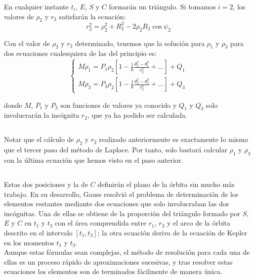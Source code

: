 \documentclass[11pt]{article}
\begin{document}
En cualquier instante $t_i$, $E$, $S$ y $C$ formarán un triángulo. Si tomamos $i=2$, los valores de $\rho_2$ y $r_2$ satisfarán la ecuación:
\[
r_2^2=\rho_2^2+R_2^2-2\rho_2R_2\cos{\psi_2}
\]

Con el valor de $\rho_2$ y $r_2$ determinado, tenemos que la solución para $\rho_1$ y $\rho_3$ para dos ecuaciones cualesquiera de las del principio es:
\[
\left\{
\begin{array}{l}
	M\rho_1=P_1\rho_2[1-\frac{1}{6}\frac{\theta_2^2-\theta_1^2}{r_2^3}+...]+Q_1\\
	M\rho_3=P_3\rho_2[1-\frac{1}{6}\frac{\theta_2^2-\theta_3^2}{r_2^3}+...]+Q_3
\end{array}
\right.
\]

\noindent donde $M$, $P_1$ y $P_3$ son funciones de valores ya conocido y $Q_1$ y $Q_3$ solo involucrarán la incógnita $r_2$, que ya ha podido ser calculada.\\

\subsection{}
Notar que el cálculo de $\rho_2$ y $r_2$ realizado anteriormente es exactamente lo mismo que el tercer paso del método de Laplace. Por tanto, solo bastará calcular $\rho_1$ y $\rho_3$ con la última ecuación que hemos visto en el paso anterior.\\

\subsection{}
Estas dos posiciones y la de $C$ definirán el plano de la órbita sin mucho más trabajo. En su desarrollo, Gauss resolvió el problema de determinación de los elementos restantes mediante dos ecuaciones que solo involucraban las dos incógnitas. Una de ellas se obtiene de la proporción del triángulo formado por $S$, $E$ y $C$ en $t_1$ y $t_3$ con el área comprendida entre $r_1$, $r_3$ y el arco de la órbita descrito en el intervalo $[t_1,t_3]$; la otra ecuación deriva de la ecuación de Kepler en los momentos $t_1$ y $t_3$.\\

Aunque estas fórmulas sean complejas, el método de resolución para cada una de ellas es un proceso rápido de aproximaciones sucesivas, y tras resolver estas ecuaciones los elementos son de terminados fácilmente de manera única.\\
\end{document}
